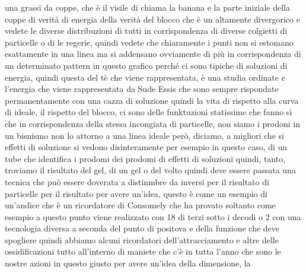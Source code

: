 {una grassi da coppe, che è il visile di chiama la banana e la parte iniziale della coppe di verità di energia della verità del blocco che è un altamente divergorico e vedete le diverse distribuzioni di tutti in corrispondenza di diverse colgietti di particelle o di le regerie, quindi vedete che chiaramente i punti non si estomano esattamente in una linea ma si addensano ovviamente di più in corrispondenza di un determinato pattern in questo grafico perché ci sono tipiche di soluzioni di energia, quindi questa del tè che viene rappresentata, è una studia ordinate e l'energia che viene rappresentata da Sude Essis che sono sempre rispondate permanentamente con una cazza di soluzione quindi la vita di rispetto alla curva di ideale, il rispetto del blocco, ci sono delle funktuzioni statissime che fanno sì che in corrispondenza della stessa incongiata di particelle, non siamo i prodoni in un bisnismo non lo attorno a una linea ideale però, diciamo, a migliori che si effetti di soluzione si vedono disinteramente per esempio in questo caso, di un tube che identifica i prodomi dei prodomi di effetti di soluzioni quindi, tanto, troviamo il risultato del gel, di un gel o del volto quindi deve essere passata una tecnica che può essere doverata a distinmbre da inversi per il risultato di particelle per il risultato per avere un'idea, questo è come un esempio di un'andice che è un ricordatore di Consomely che ha provato soltanto come esempio a questo punto viene realizzato con 18 di terzi sotto i decodi o 2 con una tecnologia diversa a seconda del punto di positova e della funzione che deve spogliere quindi abbiamo alcuni ricordatori dell'attracciamento e altre delle ossidificazioni tutto all'interno di maniete che c'è in tutta l'anno che sono le nostre azioni in questo giusto per avere un'idea della dimensione, la

}
